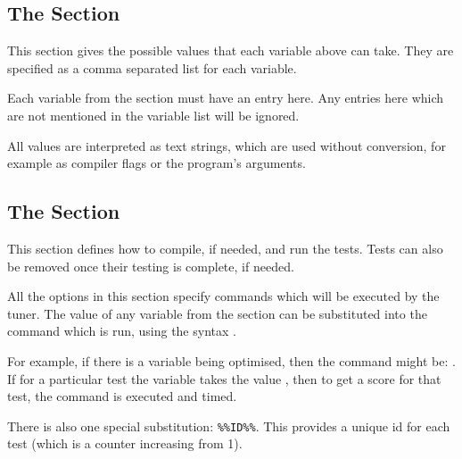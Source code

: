 \documentclass[a4paper, draft]{article}
\begin{document}
\subsection{The \confsnippet{[values]} Section}
This section gives the possible values that each variable above can take. They 
are specified as a comma separated list for each variable.

Each variable from the \confsnippet{[variables]} section must have an entry 
here. Any entries here which are not mentioned in the variable list will 
be ignored.

All values are interpreted as text strings, which are used without conversion, 
for example as compiler flags or the program's arguments.




\subsection{The \confsnippet{[testing]} Section}
This section defines how to compile, if needed, and run the tests. Tests can 
also be removed once their testing is complete, if needed.

All the options in this section specify commands which will be executed by the 
tuner. The value of any variable from the \confsnippet{[variables]} section 
can be substituted into the command which is run, using the syntax 
.

For example, if there is a variable  being optimised, then the 
 command might be: . 
If for a particular test the variable  takes the value , then 
to get a score for that test, the command  
is executed and timed.

There is also one special substitution: \texttt{\%\%ID\%\%}. 
This provides a unique id for each test (which is a counter increasing from 1).
\end{document}
